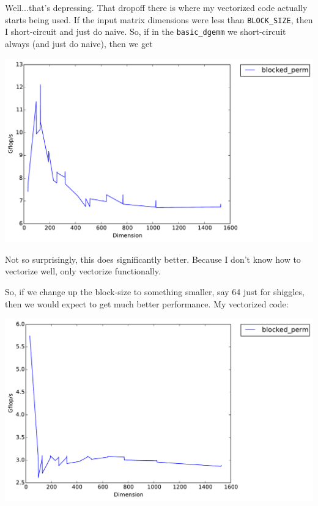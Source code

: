 \documentclass[11pt]{article}
\begin{document}
\noindent Well...that's depressing.  That dropoff there is where my vectorized code actually starts being used.  If the input matrix dimensions were less than \texttt{BLOCK\_SIZE}, then I short-circuit and just do naive. So, if in the \texttt{basic\_dgemm} we short-circuit always (and just do naive), then we get

\begin{center}
    \includegraphics[scale=0.5]{benchmarking/hand-vectorized/naive_350_ish.pdf}
\end{center}

\noindent Not so surprisingly, this does significantly better.  Because I don't know how to vectorize well, only vectorize functionally.

\noindent So, if we change up the block-size to something smaller, say 64 just for shiggles, then we would expect to get much better performance.  My vectorized code:

\begin{center}
    \includegraphics[scale=0.5]{benchmarking/hand-vectorized/my_vectorized_64.pdf}
\end{center}
\end{document}
